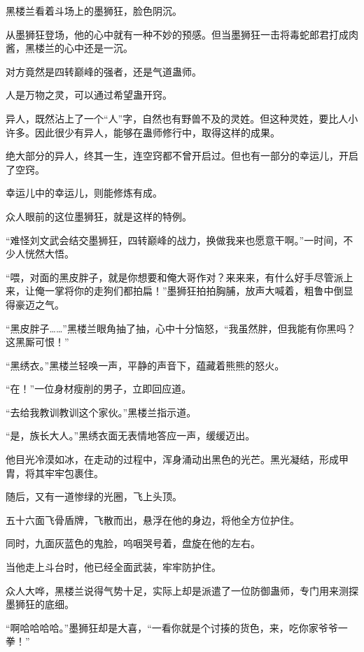 
\begin{this_body}

黑楼兰看着斗场上的墨狮狂，脸色阴沉。

从墨狮狂登场，他的心中就有一种不妙的预感。但当墨狮狂一击将毒蛇郎君打成肉酱，黑楼兰的心中还是一沉。

对方竟然是四转巅峰的强者，还是气道蛊师。

人是万物之灵，可以通过希望蛊开窍。

异人，既然沾上了一个“人”字，自然也有野兽不及的灵姓。但这种灵姓，要比人小许多。因此很少有异人，能够在蛊师修行中，取得这样的成果。

绝大部分的异人，终其一生，连空窍都不曾开启过。但也有一部分的幸运儿，开启了空窍。

幸运儿中的幸运儿，则能修炼有成。

众人眼前的这位墨狮狂，就是这样的特例。

“难怪刘文武会结交墨狮狂，四转巅峰的战力，换做我来也愿意干啊。”一时间，不少人恍然大悟。

“喂，对面的黑皮胖子，就是你想要和俺大哥作对？来来来，有什么好手尽管派上来，让俺一掌将你的走狗们都拍扁！”墨狮狂拍拍胸脯，放声大喊着，粗鲁中倒显得豪迈之气。

“黑皮胖子……”黑楼兰眼角抽了抽，心中十分恼怒，“我虽然胖，但我能有你黑吗？这黑厮可恨！”

“黑绣衣。”黑楼兰轻唤一声，平静的声音下，蕴藏着熊熊的怒火。

“在！”一位身材瘦削的男子，立即回应道。

“去给我教训教训这个家伙。”黑楼兰指示道。

“是，族长大人。”黑绣衣面无表情地答应一声，缓缓迈出。

他目光冷漠如冰，在走动的过程中，浑身涌动出黑色的光芒。黑光凝结，形成甲胄，将其牢牢包裹住。

随后，又有一道惨绿的光圈，飞上头顶。

五十六面飞骨盾牌，飞散而出，悬浮在他的身边，将他全方位护住。

同时，九面灰蓝色的鬼脸，呜咽哭号着，盘旋在他的左右。

当他走上斗台时，他已经全面武装，牢牢防护住。

众人大哗，黑楼兰说得气势十足，实际上却是派遣了一位防御蛊师，专门用来测探墨狮狂的底细。

“啊哈哈哈哈。”墨狮狂却是大喜，“一看你就是个讨揍的货色，来，吃你家爷爷一拳！”


\end{this_body}
